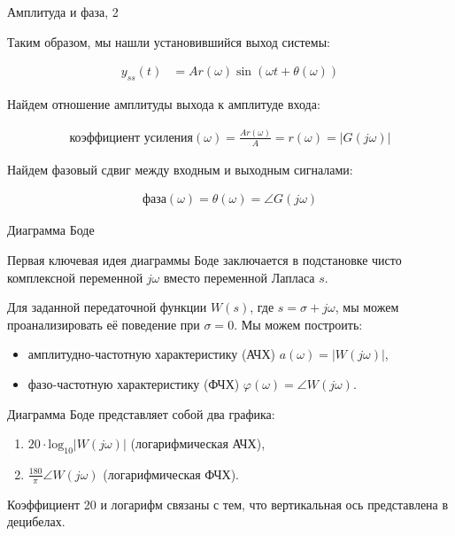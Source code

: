 \documentclass{beamer}
\begin{document}
\begin{frame}{Амплитуда и фаза, 2}
	\begin{flushleft}
		
		Таким образом, мы нашли установившийся выход системы:
		
		\begin{align}
			y_{ss}(t) &= 
			A r(\omega) \sin (\omega t + \theta(\omega))
		\end{align}
		
		Найдем отношение амплитуды выхода к амплитуде входа:
		
		\begin{align}
			\text{коэффициент усиления}(\omega)
			=
			\frac{A r(\omega)}{A} = r(\omega) = |G(j\omega)|
		\end{align}
		
		Найдем фазовый сдвиг между входным и выходным сигналами:
		
		\begin{align}
			\text{фаза}(\omega)
			=
			\theta(\omega) 
			=
			\angle G(j\omega)
		\end{align}
		
	\end{flushleft}
\end{frame}




\begin{frame}{Диаграмма Боде}
	\begin{flushleft}
		
		Первая ключевая идея диаграммы Боде заключается в подстановке чисто комплексной переменной $j \omega$ вместо переменной Лапласа $s$.
		
		\bigskip
		
		Для заданной передаточной функции $W(s)$, где $s = \sigma + j \omega$, мы можем проанализировать её поведение при $\sigma = 0$. Мы можем построить:
		
		\begin{itemize}
			\item амплитудно-частотную характеристику (АЧХ) $a(\omega) = \left| W(j \omega) \right|$,
			
			\item фазо-частотную характеристику (ФЧХ) $\varphi(\omega) = \angle W(j\omega)$.
		\end{itemize}
		
		\bigskip
		
		Диаграмма Боде представляет собой два графика: 
		
		\begin{enumerate}
			\item  $20 \cdot \text{log}_{10}\left| W(j \omega) \right|$ (логарифмическая АЧХ),
			
			\item $\frac{180}{\pi} \angle W(j\omega)$ (логарифмическая ФЧХ).
		\end{enumerate}
		
		Коэффициент 20 и логарифм связаны с тем, что вертикальная ось представлена в децибелах. 
		
	\end{flushleft}
\end{frame}
\end{document}

